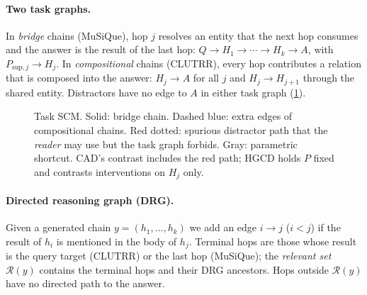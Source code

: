 \documentclass[11pt]{article}
\newcommand{\Rel}{\mathcal{R}}
\newcommand{\hgcd}{\textsc{HGCD}}
\begin{document}
\paragraph{Two task graphs.} In \emph{bridge} chains (MuSiQue), hop $j$ resolves an entity that
the next hop consumes and the answer is the result of the last hop:
$Q\to H_1\to\cdots\to H_k\to A$, with $P_{\mathrm{sup},j}\to H_j$. In \emph{compositional} chains
(CLUTRR), every hop contributes a relation that is composed into the answer:
$H_j\to A$ for all $j$ and $H_j\to H_{j+1}$ through the shared entity. Distractors have no edge to
$A$ in either task graph (\cref{fig:scm}).

\begin{figure}[t]
\centering
{}
\caption{Task SCM. Solid: bridge chain. Dashed blue: extra edges of compositional chains. Red
dotted: spurious distractor path that the \emph{reader} may use but the task graph forbids. Gray:
parametric shortcut. CAD's contrast includes the red path; \hgcd{} holds $P$ fixed and contrasts
interventions on $H_j$ only.}
\label{fig:scm}
\end{figure}

\paragraph{Directed reasoning graph (DRG).} Given a generated chain $y=(h_1,\dots,h_k)$ we add an
edge $i\to j$ ($i<j$) if the result of $h_i$ is mentioned in the body of $h_j$. Terminal hops are
those whose result is the query target (CLUTRR) or the last hop (MuSiQue); the \emph{relevant set}
$\Rel(y)$ contains the terminal hops and their DRG ancestors. Hops outside $\Rel(y)$ have no
directed path to the answer.
\end{document}
